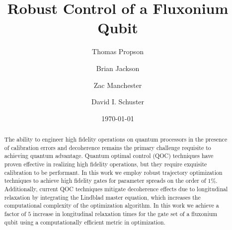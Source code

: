 \documentclass[
  amsfonts,
  amsmath,
  tbtags,
  amssymb,
  aps,
  nobibnotes,
  twocolumn,
  superscriptaddress,
]{revtex4-2}
\begin{document}
\title{Robust Control of a Fluxonium Qubit}

\author{Thomas Propson}
\author{Brian Jackson}
\author{Zac Manchester}
\author{David I. Schuster}

\date{\today}


\begin{abstract}
  The ability to engineer high fidelity operations on quantum processors in the presence of
  calibration errors and decoherence remains the primary challenge requisite to achieving quantum advantage.
  Quantum optimal control (QOC) techniques have proven effective in realizing high fidelity operations,
  but they require exquisite calibration to be performant. In this work we employ robust trajectory optimization techniques
  to achieve high fidelity gates for parameter spreads on the order of $1\%$. 
  Additionally, current QOC techniques mitigate decoherence effects due to longitudinal relaxation by integrating
  the Lindblad master equation, which increases the computational complexity
  of the optimization algorithm.
  In this work we achieve a factor of $5$ increase in longitudinal relaxation times
  for the gate set of a fluxonium qubit
  using a computationally efficient metric in optimization.
\end{abstract}

\maketitle


\end{document}
